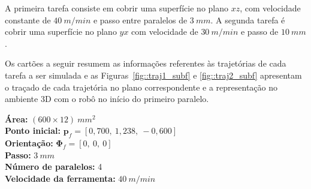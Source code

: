 A primeira tarefa consiste em cobrir uma superfície no plano $xz$, com
velocidade constante de $40~m/min$ e passo entre paralelos de $3~mm$. A segunda
tarefa é cobrir uma superfície no plano $yx$ com velocidade de $30~m/min$ e
passo de $10~mm$.

Os cartões a seguir resumem as informações referentes às trajetórias de cada
tarefa a ser simulada e as Figuras~\ref{fig::traj1_subf} e \ref{fig::traj2_subf}
apresentam o traçado de cada trajetória no plano correspondente e a
representação no ambiente 3D com o robô no início do primeiro paralelo.
%
\newline
\begin{tcolorbox}
[colframe=black!75!white, colback=white, title = Tarefa 1 -- Plano xz] 
  \textbf{Área:} $(600 \times 12)~mm^2$ \\
  \textbf{Ponto inicial:} $\mathbf{p}_f = [0,700,~1,238,~-0,600]$ \\
  \textbf{Orientação:} $\boldsymbol{\Phi}_{f} = [0,~0,~0]$ \\
  \textbf{Passo:} $3~mm$ \\
  \textbf{Número de paralelos:} 4 \\
  \textbf{Velocidade da ferramenta:} $40~m/min$
\end{tcolorbox}
%
